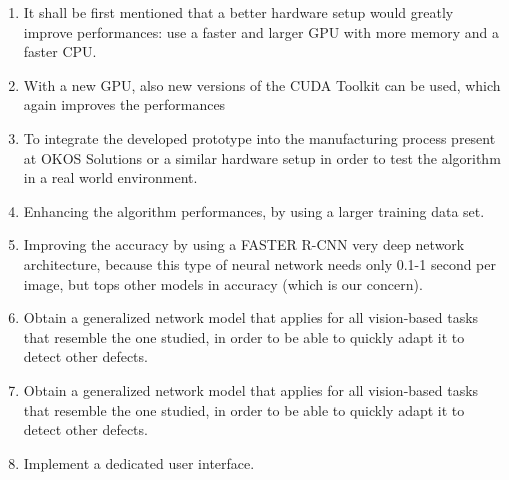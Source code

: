 \documentclass[12pt,a4paper,twoside]{report}
\begin{document}
\begin{enumerate}
    \item It shall be first mentioned that a better hardware setup would greatly improve performances: use a faster and larger GPU with more memory and a faster CPU.
    \item With a new GPU, also new versions of the CUDA Toolkit can be used, which again improves the performances
    \item To integrate the developed prototype into the manufacturing process present at OKOS Solutions or a similar hardware setup in order to test the algorithm in a real world environment.
    \item Enhancing the algorithm performances, by using a larger training data set.
    \item Improving the accuracy by using a FASTER R-CNN very deep network architecture, because this type of neural network needs only 0.1-1 second per image, but tops other models in accuracy (which is our concern).
    \item Obtain a generalized network model that applies for all vision-based tasks that resemble the one studied, in order to be able to quickly adapt it to detect other defects.
    \item Obtain a generalized network model that applies for all vision-based tasks that resemble the one studied, in order to be able to quickly adapt it to detect other defects.
    \item Implement a dedicated user interface.
\end{enumerate}
\end{document}
